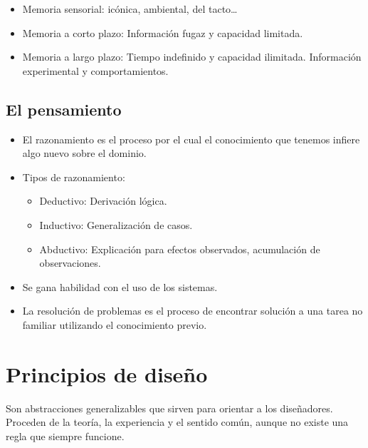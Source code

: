 \documentclass[12pt, twoside, openright]{report} %
\begin{document}
      \begin{itemize}
      
      \item
        Memoria sensorial: icónica, ambiental, del tacto\ldots{}
      \item
        Memoria a corto plazo: Información fugaz y capacidad limitada.
      \item
        Memoria a largo plazo: Tiempo indefinido y capacidad ilimitada.
        Información experimental y comportamientos.
      \end{itemize}
\subsection{El pensamiento}

      \begin{itemize}
      
      \item
        El razonamiento es el proceso por el cual el conocimiento que
        tenemos infiere algo nuevo sobre el dominio.
      \item
        Tipos de razonamiento:

        \begin{itemize}
        
        \item
          Deductivo: Derivación lógica.
        \item
          Inductivo: Generalización de casos.
        \item
          Abductivo: Explicación para efectos observados, acumulación de
          observaciones.
        \end{itemize}
      \item
        Se gana habilidad con el uso de los sistemas.
      \item
        La resolución de problemas es el proceso de encontrar solución a
        una tarea no familiar utilizando el conocimiento previo.
      \end{itemize}

	  
\section{Principios de diseño}

  Son abstracciones generalizables que sirven para orientar a los
  diseñadores. Proceden de la teoría, la experiencia y el sentido común,
  aunque no existe una regla que siempre funcione.
\end{document}
